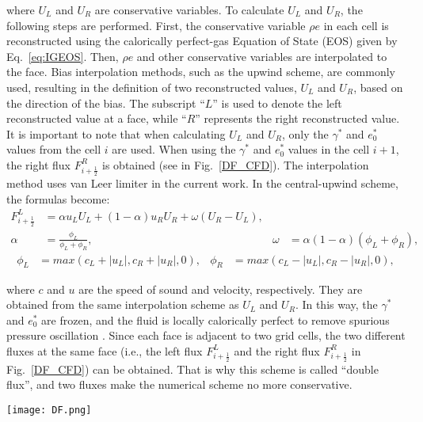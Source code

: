 where $U_L$ and $U_R$ are conservative variables. To calculate $U_L$ and $U_R$, the following steps are performed. First, the conservative variable $\rho e$ in each cell is reconstructed using the calorically perfect-gas Equation of State (EOS) given by Eq.~\ref{eq:IGEOS}. Then, $\rho e$ and other conservative variables are interpolated to the face. Bias interpolation methods, such as the upwind scheme, are commonly used, resulting in the definition of two reconstructed values, $U_L$ and $U_R$, based on the direction of the bias. The subscript ``$L$'' is used to denote the left reconstructed value at a face, while ``$R$'' represents the right reconstructed value. It is important to note that when calculating $U_L$ and $U_R$, only the $\gamma^*$ and $e_0^*$ values from the cell $i$ are used. When using the $\gamma^*$ and $e_0^*$ values in the cell $i+1$, the right flux $F^R_{i+\frac{1}{2}}$ is obtained (see in Fig.~\ref{DF_CFD}). The interpolation method uses van Leer limiter \cite{van1974towards} in the current work. In the central-upwind scheme, the formulas become:
\begin{align}
	F^L_{i+\frac{1}{2}} & = \alpha u_LU_L + \left(1-\alpha\right)u_R U_R + \omega \left(U_R-U_L\right),   \\
	\alpha              & = \frac{\phi_L}{\phi_L +\phi_R},                                              &
	\omega              & = \alpha \left(1-\alpha\right) \left(\phi_L+\phi_R\right),
\end{align}
\begin{align}
	\phi_L & = max\left(c_L+|u_L|,c_R + |u_R|,0\right), & \phi_R & = max\left(c_L-|u_L|,c_R - |u_R|,0\right),
\end{align}

where $c$ and $u$ are the speed of sound and velocity, respectively. They are obtained from the same interpolation scheme as $U_L$ and $U_R$.
In this way, the $\gamma^*$ and $e_0^*$ are frozen, and the fluid is locally calorically perfect to remove spurious pressure oscillation \cite{ma2017entropy}.
Since each face is adjacent to two grid cells, the two different fluxes at the same face (i.e., the left flux $F^L_{i+\frac{1}{2}}$ and the right flux $F^R_{i+\frac{1}{2}}$ in Fig.~\ref{DF_CFD}) can be obtained. That is why this scheme is called ``double flux'', and two fluxes make the numerical scheme no more conservative.
\begin{figure*}[htbp]
	\centering
	\texttt{[image: DF.png]}
	\caption{Schematic of the double flux (DF) method in a one-dimensional mesh.}
	\label{DF_CFD}
\end{figure*}

